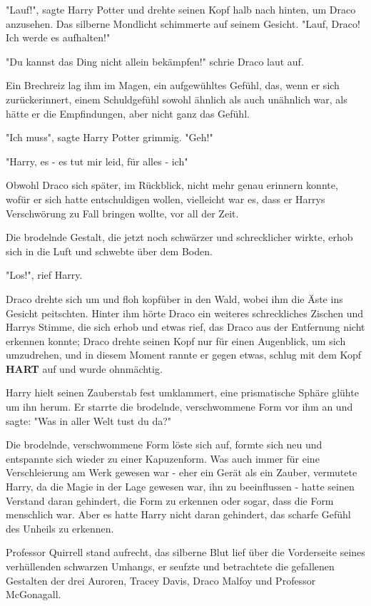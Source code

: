 {"Lauf!", sagte Harry Potter und drehte seinen Kopf halb nach hinten, um Draco anzusehen. Das silberne Mondlicht schimmerte auf seinem Gesicht. "Lauf, Draco! Ich werde es aufhalten!"

"Du kannst das Ding nicht allein bekämpfen!" schrie Draco laut auf.

Ein Brechreiz lag ihm im Magen, ein aufgewühltes Gefühl, das, wenn er sich zurückerinnert, einem Schuldgefühl sowohl ähnlich als auch unähnlich war, als hätte er die Empfindungen, aber nicht ganz das Gefühl.

"Ich muss", sagte Harry Potter grimmig. "Geh!"

"Harry, es - es tut mir leid, für alles - ich"

Obwohl Draco sich später, im Rückblick, nicht mehr genau erinnern konnte, wofür er sich hatte entschuldigen wollen, vielleicht war es, dass er Harrys Verschwörung zu Fall bringen wollte, vor all der Zeit.

Die brodelnde Gestalt, die jetzt noch schwärzer und schrecklicher wirkte, erhob sich in die Luft und schwebte über dem Boden.

"Los!", rief Harry.

Draco drehte sich um und floh kopfüber in den Wald, wobei ihm die Äste ins Gesicht peitschten. Hinter ihm hörte Draco ein weiteres schreckliches Zischen und Harrys Stimme, die sich erhob und etwas rief, das Draco aus der Entfernung nicht erkennen konnte; Draco drehte seinen Kopf nur für einen Augenblick, um sich umzudrehen, und in diesem Moment rannte er gegen etwas, schlug mit dem Kopf \textbf{HART} auf und wurde ohnmächtig.

Harry hielt seinen Zauberstab fest umklammert, eine prismatische Sphäre glühte um ihn herum. Er starrte die brodelnde, verschwommene Form vor ihm an und sagte: "Was in aller Welt tust du da?"

Die brodelnde, verschwommene Form löste sich auf, formte sich neu und entspannte sich wieder zu einer Kapuzenform. Was auch immer für eine Verschleierung am Werk gewesen war - eher ein Gerät als ein Zauber, vermutete Harry, da die Magie in der Lage gewesen war, ihn zu beeinflussen - hatte seinen Verstand daran gehindert, die Form zu erkennen oder sogar, dass die Form menschlich war. Aber es hatte Harry nicht daran gehindert, das scharfe Gefühl des Unheils zu erkennen.

Professor Quirrell stand aufrecht, das silberne Blut lief über die Vorderseite seines verhüllenden schwarzen Umhangs, er seufzte und betrachtete die gefallenen Gestalten der drei Auroren, Tracey Davis, Draco Malfoy und Professor McGonagall.

}
